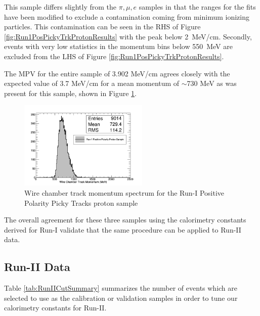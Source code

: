 This sample differs slightly from the $\pi, \mu, e$ samples in that the ranges for the fits have been modified to exclude a contamination coming from minimum ionizing particles. This contamination can be seen in the RHS of Figure \ref{fig:Run1PosPickyTrkProtonResults} with the peak below 2~MeV/cm. Secondly, events with very low statistics in the momentum bins below 550~MeV are excluded from the LHS of Figure \ref{fig:Run1PosPickyTrkProtonResults}.

The MPV for the entire sample of 3.902 MeV/cm agrees closely with the expected value of 3.7 MeV/cm for a mean momentum of $\sim$730 MeV as was present for this sample, shown in Figure \ref{fig:Run1PosPickyTrkProtonMomentumSpec}.

\begin{figure}[htb]
\centering
\includegraphics[width=0.55\textwidth]{images/WCTrkMomentumRun1PosProton.png}
\caption{Wire chamber track momentum spectrum for the Run-I Positive Polarity Picky Tracks proton sample  }
\label{fig:Run1PosPickyTrkProtonMomentumSpec}
\end{figure}

The overall agreement for these three samples using the calorimetry constants derived for Run-I validate that the same procedure can be applied to Run-II data.

\newpage
\subsection{Run-II Data}\label{sec:RunII}
Table \ref{tab:RunIICutSummary} summarizes the number of events which are selected to use as the calibration or validation samples in order to tune our calorimetry constants for Run-II.

